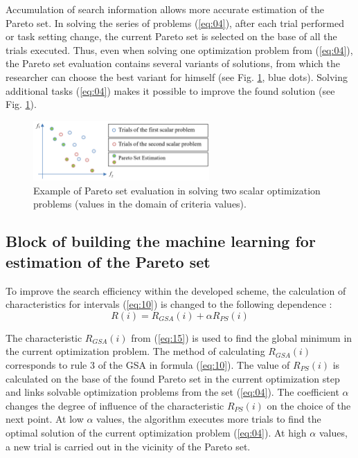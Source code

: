 \documentclass[runningheads]{llncs}
\begin{document}
Accumulation of search information allows more accurate estimation of the Pareto set. In solving the series of problems (\ref{eq:04}), after each trial performed or task setting change, the current Pareto set is selected on the base of all the trials executed. Thus, even when solving one optimization problem from (\ref{eq:04}), the Pareto set evaluation contains several variants of solutions, from which the researcher can choose the best variant for himself (see Fig. \ref{fig2}, blue dots). Solving additional tasks (\ref{eq:04}) makes it possible to improve the found solution (see Fig. \ref{fig2}).

\begin{figure}
\center
\includegraphics[width=0.6\textwidth]{fig2.png}
\caption{Example of Pareto set evaluation in solving two scalar optimization problems (values in the domain of criteria values).} \label{fig2}
\end{figure}


\subsection{Block of  building the machine learning for estimation of the Pareto set}
\label{subsec34}

To improve the search efficiency within the developed scheme, the calculation of characteristics for intervals (\ref{eq:10}) is changed to the following dependence \cite{Konnov2025}:
\begin{equation}
    \label{eq:15}
    R(i) = R_{GSA} (i) +  \alpha R_{PS} (i)
\end{equation}

The characteristic $R_{GSA}(i)$ from (\ref{eq:15}) is used to find the global minimum in the current optimization problem. The method of calculating $R_{GSA}(i)$ corresponds to rule 3 of the GSA in formula (\ref{eq:10}). The value of $R_{PS}(i)$ is calculated on the base of the found Pareto set in the current optimization step and links solvable optimization problems from the set (\ref{eq:04}). The coefficient $\alpha$ changes the degree of influence of the characteristic  $R_{PS}(i)$ on the choice of the next point. At low $\alpha$ values, the algorithm executes more trials to find the optimal solution of the current optimization problem (\ref{eq:04}). At high $\alpha$ values, a new trial is carried out in the vicinity of the Pareto set. 
\end{document}
